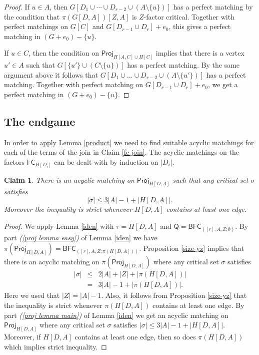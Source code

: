 \documentclass[10pt]{amsart}
\newtheorem{claim}[thm]{Claim}
\theoremstyle{definition}
\begin{document}
\begin{proof}
		If $u\in A$, then $G[D_1\cup \cdots \cup D_{r-2} \cup (A\setminus\{u\})]$ has a perfect matching by the condition that  $\pi(G[D,A])[Z,A]$ is $Z$-factor critical. Together with perfect matchings on $G[C]$ and $G[D_{r-1}\cup D_r]+e_0$, this gives a perfect matching in $(G+e_0)-\{u\}$.
		
		If $u\in C$, then the condition on $\mathsf{Proj}_{H[A,C]\cup H[C]}$ implies that there is a vertex $u'\in A$ such that $G[\{u'\} \cup (C\setminus \{u\})]$ has a perfect matching. By the same argument above it follows that $G[D_1 \cup \dots \cup D_{r-2} \cup (A\setminus\{u'\})]$ has a perfect matching. Together with perfect matching on $G[D_{r-1}\cup D_r]+e_0$, we get a perfect matching in $(G+e_0)-\{u\}$.
	\end{proof}
	
	\subsection*{The endgame}
	In order to apply Lemma \ref{product} we need to find suitable acyclic matchings for each of the terms of the join in Claim \ref{fc join}. The acyclic matchings on the factors $\mathsf{FC}_{H[D_i]}$ can be dealt with by induction on $|D_i|$.
	
	\begin{claim}\label{projection 1 DA}
		There is an acyclic matching on $\mathsf{Proj}_{H[D,A]}$ such that any critical set $\sigma$ satisfies
		\[|\sigma| \leq 3|A|-1 + |H[D,A]|.\]
		Moreover the inequality is strict whenever $H[D,A]$ contains at least one edge. 
	\end{claim}
	
	\begin{proof}
		We apply Lemma \ref{iden} with $\tau = H[D,A]$ and $\mathsf{Q} = \mathsf{BFC}_{([r],A,Z; \emptyset)}$. By part {\em (\ref{proj lemma easy})} of Lemma \ref{iden} we have $\pi(\mathsf{Proj}_{H[D,A]}) = \mathsf{BFC}_{([r],A,Z; \pi(H[D,A]))}$. Proposition \ref{size-yz} implies that there is an acyclic matching on $\pi(\mathsf{Proj}_{H[D,A]})$ where any critical set $\sigma$ satisfies 
		\[\begin{array}{rcl}
		|\sigma| & \leq & 2|A| + |Z| + |\pi(H[D,A])|  \\
		& = & 3|A|-1 + |\pi(H[D,A])|.
		\end{array}\]
		Here we used that $|Z| = |A|-1$. Also, it follows from Proposition \ref{size-yz} that the inequality is strict whenever $\pi(H[D,A])$ contains at least one edge. By part {\em (\ref{proj lemma main})} of Lemma \ref{iden} we get an acyclic matching on $\mathsf{Proj}_{H[D,A]}$ where any critical set $\sigma$ satisfies $|\sigma|\leq 3|A|-1 + |H[D,A]|$. Moreover, if $H[D,A]$ contains at least one edge, then so does $\pi(H[D,A])$ which implies strict inequality. 
	\end{proof}
	
\end{document}
